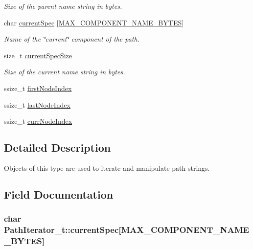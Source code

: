 \begin{DoxyCompactItemize}
\begin{DoxyCompactList}\small\item\em Size of the parent name string in bytes. \end{DoxyCompactList}\item 
char \hyperlink{struct_path_iterator__t_a2e2ad51815414ad0995ba20eb2bb632e}{current\+Spec} \mbox{[}\hyperlink{path_iter_8c_a4ab86e7102448b00d4a7b23a07a6431a}{M\+A\+X\+\_\+\+C\+O\+M\+P\+O\+N\+E\+N\+T\+\_\+\+N\+A\+M\+E\+\_\+\+B\+Y\+T\+ES}\mbox{]}
\begin{DoxyCompactList}\small\item\em Name of the \char`\"{}current\char`\"{} component of the path. \end{DoxyCompactList}\item 
size\+\_\+t \hyperlink{struct_path_iterator__t_a8a377599f53a007242e8ce9a95568a1e}{current\+Spec\+Size}
\begin{DoxyCompactList}\small\item\em Size of the current name string in bytes. \end{DoxyCompactList}\item 
ssize\+\_\+t \hyperlink{struct_path_iterator__t_a4a980497d340500884ab5e45bdc005ed}{first\+Node\+Index}
\item 
ssize\+\_\+t \hyperlink{struct_path_iterator__t_a0a386d7b07d128720b0f131c0f39707d}{last\+Node\+Index}
\item 
ssize\+\_\+t \hyperlink{struct_path_iterator__t_ae58f342c3f72cb0a695e05fc7c3a42d7}{curr\+Node\+Index}
\end{DoxyCompactItemize}


\subsection{Detailed Description}
Objects of this type are used to iterate and manipulate path strings. 

\subsection{Field Documentation}
\subsubsection[{\texorpdfstring{current\+Spec}{currentSpec}}]{\setlength{\rightskip}{0pt plus 5cm}char Path\+Iterator\+\_\+t\+::current\+Spec\mbox{[}{\bf M\+A\+X\+\_\+\+C\+O\+M\+P\+O\+N\+E\+N\+T\+\_\+\+N\+A\+M\+E\+\_\+\+B\+Y\+T\+ES}\mbox{]}}\hypertarget{struct_path_iterator__t_a2e2ad51815414ad0995ba20eb2bb632e}{}\label{struct_path_iterator__t_a2e2ad51815414ad0995ba20eb2bb632e}


